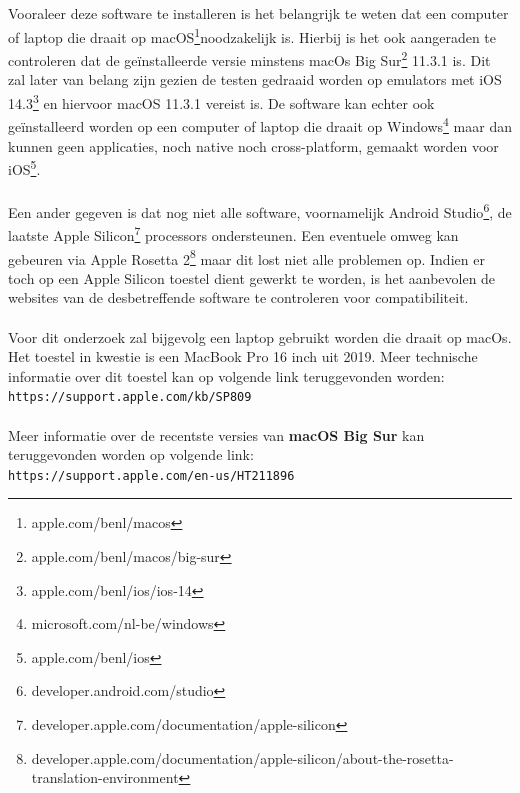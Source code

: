     \subsection{}
    \label{sec:I-hardware}
    Vooraleer deze software te installeren is het belangrijk te weten dat een computer of laptop die draait op macOS\footnote{apple.com/benl/macos}noodzakelijk is. Hierbij is het ook aangeraden te controleren dat de geïnstalleerde versie minstens macOs Big Sur\footnote{apple.com/benl/macos/big-sur} 11.3.1 is. Dit zal later van belang zijn gezien de testen gedraaid worden op emulators met  iOS 14.3\footnote{apple.com/benl/ios/ios-14} en hiervoor macOS 11.3.1 vereist is. De software kan echter ook geïnstalleerd worden op een computer of laptop die draait op Windows\footnote{microsoft.com/nl-be/windows} maar dan kunnen geen applicaties, noch native noch cross-platform, gemaakt worden voor iOS\footnote{apple.com/benl/ios}.
    \\ \\
    Een ander gegeven is dat nog niet alle software, voornamelijk Android Studio\footnote{developer.android.com/studio}, de laatste Apple Silicon\footnote{developer.apple.com/documentation/apple-silicon} processors ondersteunen. Een eventuele omweg kan gebeuren via Apple Rosetta 2\footnote{developer.apple.com/documentation/apple-silicon/about-the-rosetta-translation-environment} maar dit lost niet alle problemen op. Indien er toch op een Apple Silicon toestel dient gewerkt te worden, is het aanbevolen de websites van de desbetreffende software te controleren voor compatibiliteit.  
    \\ \\
    Voor dit onderzoek zal bijgevolg een laptop gebruikt worden die draait op macOs. Het toestel in kwestie is een MacBook Pro 16 inch uit 2019.
    Meer technische informatie over dit toestel kan op volgende link teruggevonden worden:\\
    \verb*|https://support.apple.com/kb/SP809|
    \\ \\
    Meer informatie over de recentste versies van \textbf{macOS Big Sur} kan teruggevonden worden op volgende link:\\
    \verb*|https://support.apple.com/en-us/HT211896|

